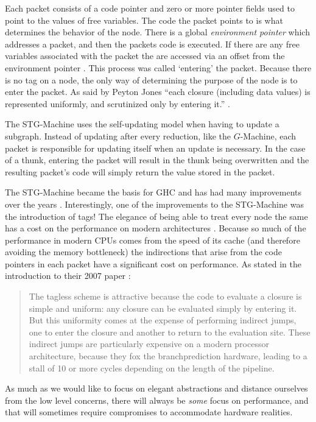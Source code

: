     Each packet consists of a code pointer and zero or more pointer fields used
to point to the values of free variables. The code the packet points to is what
determines the behavior of the node. There is a global \emph{environment
pointer} which addresses a packet, and then the packets code is executed. If
there are any free variables associated with the packet the are accessed via an
offset from the environment pointer \citep{jones1992implementing}. This process
was called `entering' the packet. Because there is no tag on a node, the only
way of determining the purpose of the node is to enter the packet. As said by
Peyton Jones ``each closure (including data values) is represented uniformly,
and scrutinized only by entering it.'' \citep{jones1992implementing}.

    The STG-Machine uses the self-updating model when having to update a
subgraph. Instead of updating after every reduction, like the $G$-Machine, each
packet is responsible for updating itself when an update is necessary. In the
case of a thunk, entering the packet will result in the thunk being overwritten
and the resulting packet's code will simply return the value stored in the
packet.

    The STG-Machine became the basis for GHC and has had many improvements over
the years \citep{HistoryOfHaskell}. Interestingly, one of the improvements to the
STG-Machine was the introduction of tags! The elegance of being able to treat
every node the same has a cost on the performance on modern architectures
\citep{marlow2007faster}.
Because so much of the performance in modern CPUs comes from the speed of its
cache (and therefore avoiding the memory bottleneck) the indirections that arise
from the code pointers in each packet have a significant cost on performance. As
stated in the introduction to their 2007 paper \citep{marlow2007faster}:
\begin{quote}
The tagless scheme is attractive because the code to evaluate a closure is
simple and uniform: any closure can be evaluated simply by
entering it. But this uniformity comes at the expense of performing indirect
jumps, one to enter the closure and another to return to
the evaluation site. These indirect jumps are particularly expensive
on a modern processor architecture, because they fox the branchprediction
hardware, leading to a stall of 10 or more cycles depending on the length of the
pipeline.
\end{quote}

As much as we would like to focus on elegant abstractions and distance
ourselves from the low level concerns, there will always be \emph{some} focus on
performance, and that will sometimes require compromises to accommodate hardware
realities.
